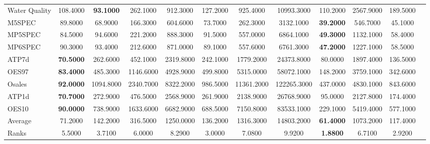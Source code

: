 \begin{threeparttable}
{{\begin{tabular}{lccccccccccc}
Water Quality &108.4000 &\textbf{93.1000} &262.1000 &912.3000 &127.2000 &925.4000 &10993.3000 &110.2000 &2567.9000 &189.5000 &  \\
M5SPEC &89.8000 &68.9000 &166.3000 &604.6000 &73.7000 &262.3000 &3132.1000 &\textbf{39.2000} &546.7000 &45.1000 &  \\
MP5SPEC &84.5000 &94.6000 &221.2000 &888.3000 &91.5000 &557.0000 &6864.1000 &\textbf{49.3000} &1132.1000 &58.4000 &  \\
MP6SPEC &90.3000 &93.4000 &212.6000 &871.0000 &89.1000 &557.6000 &6761.3000 &\textbf{47.2000} &1227.1000 &58.5000 &  \\
ATP7d &\textbf{70.5000} &262.6000 &452.1000 &2319.8000 &242.1000 &1779.2000 &24373.8000 &80.0000 &1897.4000 &136.5000 &  \\
OES97 &\textbf{83.4000} &485.3000 &1146.6000 &4928.9000 &499.8000 &5315.0000 &58072.1000 &148.2000 &3759.1000 &342.6000 &  \\
Osales &\textbf{92.0000} &1094.8000 &2340.7000 &8322.2000 &986.5000 &11361.2000 &122265.3000 &437.0000 &4830.1000 &843.6000 &  \\
ATP1d &\textbf{70.7000} &272.9000 &476.5000 &2568.9000 &261.9000 &2138.9000 &26768.9000 &95.0000 &2127.8000 &174.4000 &  \\
OES10 &\textbf{90.0000} &738.9000 &1633.6000 &6682.9000 &688.5000 &7150.8000 &83533.1000 &229.1000 &5419.4000 &577.1000 &  \\
\hline
Average &71.2000 &142.2000 &316.5000 &1250.0000 &136.2000 &1316.3000 &14803.2000 &\textbf{61.4000} &1073.2000 &117.4000 &  \\
Ranks &5.5000 &3.7100 &6.0000 &8.2900 &3.0000 &7.0800 &9.9200 &\textbf{1.8800} &6.7100 &2.9200 &  \\
\bottomrule
\end{tabular}}}
\end{threeparttable}